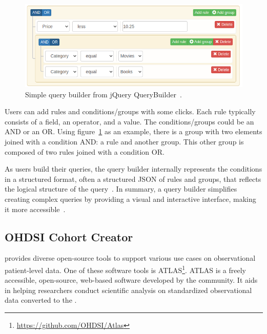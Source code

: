 \begin{figure}[H]
    \includegraphics[width=14cm]{figs/chapter2/querybuilder.png}
    \centering
    \caption[Simple query builder example]{Simple query builder from jQuery QueryBuilder~\cite{noauthor_jquery_nodate}.}
    \label{fig_query_builder}
\end{figure}

Users can add rules and conditions/groups with some clicks. Each rule typically consists of a field, an operator, and a value. The conditions/groups could be an AND or an OR. Using figure~\ref{fig_query_builder} as an example, there is a group with two elements joined with a condition AND: a rule and another group. This other group is composed of two rules joined with a condition OR.

As users build their queries, the query builder internally represents the conditions in a structured format, often a structured JSON of rules and groups, that reflects the logical structure of the query~\cite{noauthor_jquery_nodate}. In summary, a query builder simplifies creating complex queries by providing a visual and interactive interface, making it more accessible~\cite{noauthor_introducing_2021}.


\subsection{OHDSI Cohort Creator}
\label{atlas}

{\ohdsi} provides diverse open-source tools to support various use cases on observational patient-level data. One of these software tools is ATLAS\footnote{\url{https://github.com/OHDSI/Atlas}}. ATLAS is a freely accessible, open-source, web-based software developed by the {\ohdsi} community. It aids in helping researchers conduct scientific analysis on standardized observational data converted to the {\omop}.


